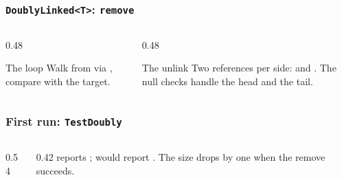 \documentclass[aspectratio=169,10pt,compress]{beamer}
\begin{document}
\begin{frame}[t,fragile] \frametitle{\texttt{DoublyLinked<T>}: \texttt{remove}}
  \begin{columns}[T]
    \begin{column}{0.48\textwidth}
      \begin{block}{The loop}
        \small
        Walk from  via , compare 
        with the target.
      \end{block}
    \end{column}
    \begin{column}{0.48\textwidth}
      \begin{block}{The unlink}
        \small
        Two references per side:
         and
        .
        The null checks handle the head and the tail.
      \end{block}
    \end{column}
  \end{columns}
\end{frame}




\begin{frame}[t,fragile] \frametitle{First run: \texttt{TestDoubly}}
  \begin{columns}[T]
    \begin{column}{0.54\textwidth}
    \end{column}
    \begin{column}{0.42\textwidth}
      \small
       reports ;  would
      report . The size drops by one when the remove succeeds.
    \end{column}
  \end{columns}
\end{frame}

\end{document}
